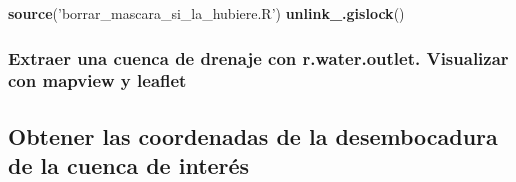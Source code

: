 \documentclass[11pt,]{article}
\newenvironment{Shaded}{\begin{snugshade}}{\end{snugshade}}
\newcommand{\KeywordTok}[1]{\textcolor[rgb]{0.13,0.29,0.53}{\textbf{#1}}}
\newcommand{\DataTypeTok}[1]{\textcolor[rgb]{0.13,0.29,0.53}{#1}}
\newcommand{\StringTok}[1]{\textcolor[rgb]{0.31,0.60,0.02}{#1}}
\newcommand{\OtherTok}[1]{\textcolor[rgb]{0.56,0.35,0.01}{#1}}
\newcommand{\OperatorTok}[1]{\textcolor[rgb]{0.81,0.36,0.00}{\textbf{#1}}}
\newcommand{\NormalTok}[1]{#1}
\begin{document}
\begin{Shaded}
\begin{Highlighting}[]
\KeywordTok{source}\NormalTok{(}\StringTok{'borrar_mascara_si_la_hubiere.R'}\NormalTok{)}
\KeywordTok{unlink_.gislock}\NormalTok{()}
\end{Highlighting}
\end{Shaded}

\subsubsection{Extraer una cuenca de drenaje con r.water.outlet.
Visualizar con mapview y
leaflet}\label{extraer-una-cuenca-de-drenaje-con-r.water.outlet.-visualizar-con-mapview-y-leaflet}

\begin{Shaded}
\end{Shaded}

\begin{Shaded}
\end{Shaded}

\subsection{Obtener las coordenadas de la desembocadura de la cuenca de
interés}\label{obtener-las-coordenadas-de-la-desembocadura-de-la-cuenca-de-interuxe9s}
\end{document}
